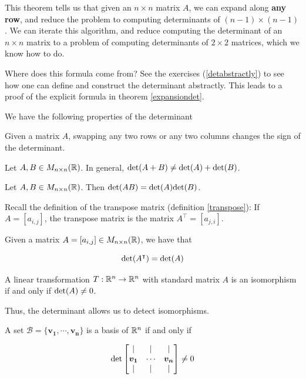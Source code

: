 This theorem tells us that given an $n \times n$ matrix $A$, we can expand along \textbf{any row}, and reduce the problem to computing determinants of $(n-1) \times (n-1)$.  We can iterate this algorithm, and reduce computing the determinant of an $n \times n$ matrix to a problem of computing determinants of $2 \times 2$ matrices, which we know how to do.


Where does this formula come from? See the exercises (\ref{detabstractly}) to see how one can define and construct the determinant abstractly.  This leads to a proof of the explicit formula in theorem \ref{expansiondet}.

We have the following properties of the determinant

\begin{proposition}
    Given a matrix $A$, swapping any two rows or any two columns changes the sign of the determinant.
\end{proposition}

    
    \begin{remark}
    Let $A, B \in M_{n \times n}(\mathbb{R})$. In general, $\textnormal{det}(A+B) \neq \textnormal{det}(A) + \textnormal{det}(B)$.
    \end{remark}
    
    \begin{theorem}

    Let $A, B \in M_{n \times n}(\mathbb{R})$.  Then $\textnormal{det}(AB) = \textnormal{det}(A)\textnormal{det}(B)$.
     
    \end{theorem}


Recall the definition of the transpose matrix (definition \ref{transpose}): If $A = [a_{i,j}]$, the transpose matrix is the matrix $A^\intercal = [a_{j,i}]$.

\begin{theorem}
Given a matrix $A = [a_{i,j}] \in M_{n\times n}(\mathbb{R})$, we have that 

$$\textnormal{det}(A^\intercal) = \textnormal{det}(A)$$
\end{theorem}


\begin{theorem}
    A linear transformation $T: \mathbb{R}^n \to \mathbb{R}^n$ with standard matrix $A$ is an isomorphism if and only if $\textnormal{det}(A) \neq 0$.
    \end{theorem}

Thus, the determinant allows us to detect isomorphisms.  

\begin{corollary}
    A set $\mathcal{B} = \{\bm{v_1}, \cdots, \bm{v_n}\}$ is a basis of $\mathbb{R}^n$ if and only if 

    $$\textnormal{det}\begin{bmatrix}
\vert & \vert & \vert \\
    \bm{v_1}  & \cdots & \bm{v_n}  \\
    \vert & \vert & \vert
\end{bmatrix} \neq 0$$
    
\end{corollary}


